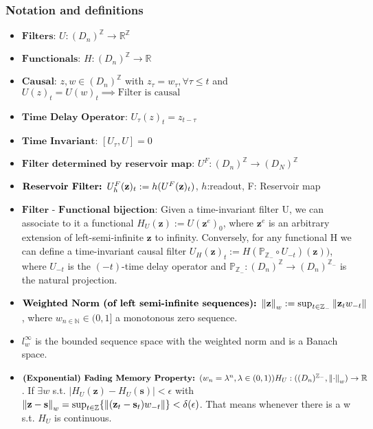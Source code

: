 \documentclass{article}
\begin{document}
\subsubsection{Notation and definitions}
\begin{itemize}
    \item $\textbf{Filters: } U:(D_n)^\mathbb{Z} \rightarrow \mathbb{R}^\mathbb{Z}$
    \item $\textbf{Functionals: } H:(D_n)^\mathbb{Z} \rightarrow \mathbb{R}$
    \item $\textbf{Causal: } z,w \in  (D_n)^\mathbb{Z}$ with $z_\tau=w_\tau, \forall \tau \leq t$ and $U(z)_t = U(w)_t \implies \text{Filter is causal}$
    \item $\textbf{Time Delay Operator: } U_\tau(z)_t = z_{t-\tau}$
    \item $\textbf{Time Invariant: } [U_\tau,U]=0$
    \item $\textbf{Filter determined by reservoir map: } U^F: (D_n)^\mathbb{Z} \rightarrow (D_N)^\mathbb{Z}$
    \item $\textbf{Reservoir Filter: } U^F_h(\textbf z)_t := h(U^F(\textbf z)_t)$, $h$:readout, F: Reservoir map
    
    \item $\textbf{Filter - Functional bijection: }$Given a time-invariant filter U, we can associate to it a functional $H_U(\textbf{z}):= U(\textbf{z}^e)_0$, where $\textbf{z}^e$ is an arbitrary extension of left-semi-infinite $\textbf{z}$ to infinity.
    Conversely, for any functional H we can define a time-invariant causal filter $U_H(\textbf{z})_t := H(\mathbb{P}_{\mathbb{Z}_{-}} \circ U_{-t})(\textbf{z}))$, where $U_{-t}$ is the $(-t)$-time delay operator and $\mathbb{P}_{\mathbb{Z}_{-}} : (D_n)^\mathbb{Z} \rightarrow (D_n)^{\mathbb{Z}_-}$ is the natural projection.
    
    \item $\textbf{Weighted Norm (of left semi-infinite sequences): } \norm{\textbf{z}}_w := \sup_{t \in \mathbb{Z}_{-}} \norm{\textbf{z}_t w_{-t}}$ , where $w_{n \in \mathbb{N}} \in (0,1]$ a monotonous zero sequence.
    
    \item   $l^\infty_w$ is the bounded sequence space with the weighted norm and is a Banach space.
    
    \item $\textbf{(Exponential) Fading Memory Property: } (w_n = \lambda^n, \lambda \in (0,1) ) H_U:((D_n)^{\mathbb{Z}_-},\norm{\cdot}_w) \rightarrow \mathbb{R}$. If $\exists w$ s.t. $|H_U(\textbf{z})-H_U(\textbf{s})| < \epsilon$ with  $\norm{\textbf{z}-\textbf{s}}_w = \sup_{t \in \mathbb{Z}} \{ \norm{(\textbf{z}_t-\textbf{s}_t)w_{-t}} \} < \delta(\epsilon)$. That means whenever there is a w s.t. $H_U$ is continuous.
    
\end{itemize}
\end{document}
